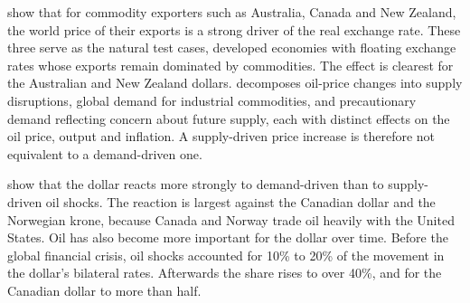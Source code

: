 
\textcite{chen_rogoff_2003} show that for commodity exporters such as Australia, Canada and New Zealand, the world price of their exports is a strong driver of the real exchange rate. These three serve as the natural test cases, developed economies with floating exchange rates whose exports remain dominated by commodities. The effect is clearest for the Australian and New Zealand dollars. \textcite{kilian_2009} decomposes oil-price changes into supply disruptions, global demand for industrial commodities, and precautionary demand reflecting concern about future supply, each with distinct effects on the oil price, output and inflation. A supply-driven price increase is therefore not equivalent to a demand-driven one.

\textcite{chen_liu_wang_zhu_2016} show that the dollar reacts more strongly to demand-driven than to supply-driven oil shocks. The reaction is largest against the Canadian dollar and the Norwegian krone, because Canada and Norway trade oil heavily with the United States. Oil has also become more important for the dollar over time. Before the global financial crisis, oil shocks accounted for 10\% to 20\% of the movement in the dollar's bilateral rates. Afterwards the share rises to over 40\%, and for the Canadian dollar to more than half.

